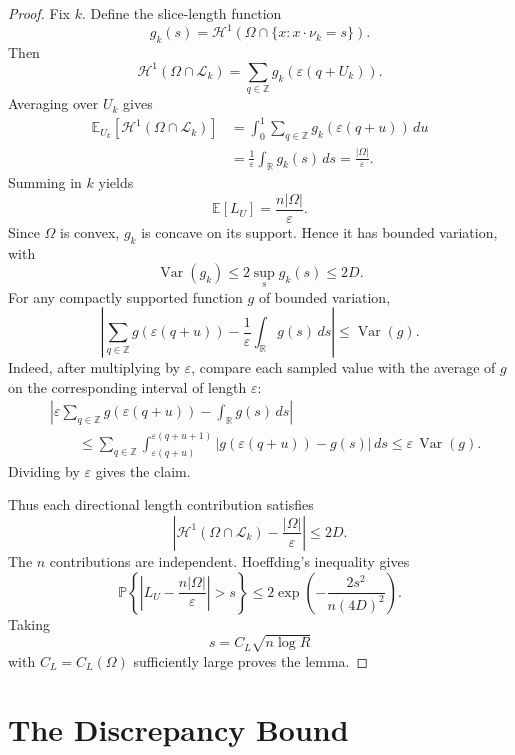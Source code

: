 \documentclass[11pt]{article}
\newcommand{\R}{\mathbb R}
\newcommand{\Z}{\mathbb Z}
\newcommand{\E}{\mathbb E}
\newcommand{\Prob}{\mathbb P}
\newcommand{\cH}{\mathcal H}
\newcommand{\eps}{\varepsilon}
\newcommand{\Var}{\operatorname{Var}}
\begin{document}
\begin{proof}
Fix $k$. Define the slice-length function
\[
        g_k(s)
        =
        \cH^1\left(
        \Omega\cap\{x:x\cdot\nu_k=s\}
        \right).
\]
Then
\[
        \cH^1(\Omega\cap\mathcal L_k)
        =
        \sum_{q\in\Z}g_k(\eps(q+U_k)).
\]
Averaging over $U_k$ gives
\[
\begin{aligned}
        \E_{U_k}\left[\cH^1(\Omega\cap\mathcal L_k)\right]
        &=
        \int_0^1
        \sum_{q\in\Z}
        g_k(\eps(q+u))
        \,du  \\
        &=
        \frac1\eps\int_\R g_k(s)\,ds
        =
        \frac{|\Omega|}{\eps}.
\end{aligned}
\]
Summing in $k$ yields
\[
        \E \left[L_U\right]=\frac{n|\Omega|}{\eps}.
\]
Since $\Omega$ is convex, $g_k$ is concave on its support. Hence it has bounded variation, with
\[
        \Var(g_k)\le 2\sup_s g_k(s)\le 2D.
\]
For any compactly supported function $g$ of bounded variation,
\[
        \left|
        \sum_{q\in\Z}g(\eps(q+u))
        -
        \frac1\eps\int_\R g(s)\,ds
        \right|
        \le
        \Var(g).
\]
Indeed, after multiplying by $\eps$, compare each sampled value with the average of $g$ on the corresponding interval of length $\eps$:
\[
\begin{aligned}
        &
        \left|
        \eps\sum_{q\in\Z}g(\eps(q+u))
        -
        \int_\R g(s)\,ds
        \right|  \\
        &\qquad\le
        \sum_{q\in\Z}
        \int_{\eps(q+u)}^{\eps(q+u+1)}
        |g(\eps(q+u))-g(s)|\,ds
        \le
        \eps\,\Var(g).
\end{aligned}
\]
Dividing by $\eps$ gives the claim.

\bigskip
\noindent
Thus each directional length contribution satisfies
\[
        \left|
        \cH^1(\Omega\cap\mathcal L_k)
        -
        \frac{|\Omega|}{\eps}
        \right|
        \le
        2D.
\]
The $n$ contributions are independent. Hoeffding's inequality gives
\[
        \Prob\left\{
        \left|
        L_U-\frac{n|\Omega|}{\eps}
        \right|>s
        \right\}
        \le
        2\exp\left(-\frac{2s^2}{n(4D)^2}\right).
\]
Taking
\[
        s=C_L\sqrt{n\log R}
\]
with $C_L=C_L(\Omega)$ sufficiently large proves the lemma.
\end{proof}

\section{The Discrepancy Bound}
\end{document}
